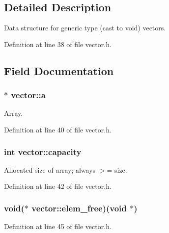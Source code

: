 \subsection{\-Detailed \-Description}
\-Data structure for generic type (cast to void) vectors. 

\-Definition at line 38 of file vector.\-h.



\subsection{\-Field \-Documentation}
\hypertarget{structvector_ae086a0bd5a910803add11ed953819018}{
\subsubsection[{a}]{$\ast$ {\bf vector\-::a}}}\label{structvector_ae086a0bd5a910803add11ed953819018}


\-Array. 



\-Definition at line 40 of file vector.\-h.

\hypertarget{structvector_a95bc684a8044cfc0e509861448908bf2}{
\subsubsection[{capacity}]{\setlength{\rightskip}{0pt plus 5cm}int {\bf vector\-::capacity}}}\label{structvector_a95bc684a8044cfc0e509861448908bf2}


\-Allocated size of array; always $>$= size. 



\-Definition at line 42 of file vector.\-h.

\hypertarget{structvector_aa707fd886c386fe365b6d6dbadb49733}{
\subsubsection[{elem\-\_\-free}]{\setlength{\rightskip}{0pt plus 5cm}void($\ast$ {\bf vector\-::elem\-\_\-free})(void $\ast$)}}\label{structvector_aa707fd886c386fe365b6d6dbadb49733}


\-Definition at line 45 of file vector.\-h.

